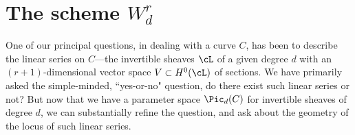 %
%
%
%
%
%
%
%

\section{The scheme $W^r_d$}

One of our principal questions, in dealing with a curve $C$, has been to describe the linear series on $C$---the invertible sheaves $\cL$ of a given degree $d$ with an $(r+1)$-dimensional  vector space $V \subset H^0(\cL)$ of sections. We have primarily asked the simple-minded, ``yes-or-no" question, do there exist such linear series or not? But now that we have a parameter space $\Pic_d(C)$ for invertible sheaves of degree $d$, we can substantially refine the question, and ask about the geometry of the locus of such linear series.

